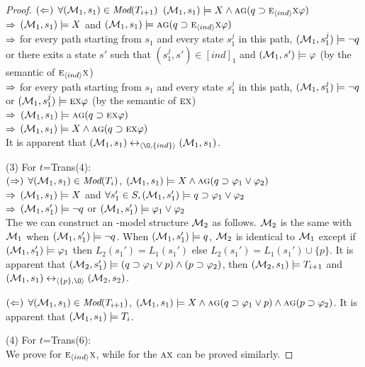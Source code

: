 \documentclass{article}
\begin{document}
\begin{proof}
$(\Leftarrow)$ $\forall ({\cal M}_1,s_1) \in \textit{Mod}(T_{i+1})$ \ie $({\cal M}_1,s_1) \models X \wedge \textsc{a} \textsc{g}(q \supset \textsc{e}_{{\langle{ind}\rangle}} \textsc{x} \varphi )$\\
$\Rightarrow$ $({\cal M}_1,s_1) \models X$ and $({\cal M}_1,s_1) \models \textsc{a} \textsc{g}(q \supset \textsc{e}_{{\langle{ind}\rangle}} \textsc{x} \varphi)$\\
$\Rightarrow$ for every path starting from $s_1$ and every state $s_1^j$ in this path, $({\cal M}_1, s_1^j) \models \neg q$ or there exits a state $s'$ such that $(s_1^j, s')\in [ind]_1$ and $({\cal M}_1, s') \models \varphi$ \hfill (by the semantic of $\textsc{e}_{{\langle{ind}\rangle}} \textsc{x}$)\\
$\Rightarrow$ for every path starting from $s_1$ and every state $s_1^j$ in this path, $({\cal M}_1, s_1^j) \models \neg q$ or $({\cal M}_1, s_1^j) \models \textsc{e} \textsc{x} \varphi$ \hfill (by the semantic of $\textsc{e} \textsc{x}$)\\
$\Rightarrow$ $({\cal M}_1,s_1) \models \textsc{a}\textsc{g}(q \supset \textsc{e} \textsc{x} \varphi)$\\
$\Rightarrow$ $({\cal M}_1, s_1) \models X \wedge \textsc{a}\textsc{g}(q \supset \textsc{e} \textsc{x} \varphi)$\\
It is apparent that $(\Hm_1, s_1) \lrto_{\tuple{{\O}, \{ind\}}} (\Hm_1, s_1)$.

(3) For $t$=Trans(4):\\
$(\Rightarrow)$ $\forall ({\cal M}_1,s_1) \in \textit{Mod}(T_i)$, \ie $({\cal M}_1,s_1) \models X \wedge \textsc{a}\textsc{g} (q \supset \varphi_1 \vee \varphi_2)$ \\
$\Rightarrow$ $({\cal M}_1,s_1) \models X$ and $\forall s_1'\in S, ({\cal M}_1,s_1') \models q \supset \varphi_1 \vee \varphi_2$\\
$\Rightarrow$ $({\cal M}_1,s_1') \models \neg q$ or $({\cal M}_1,s_1') \models \varphi_1 \vee \varphi_2$\\
The we can construct an \Ind-model structure ${\cal M}_2$ as follows. ${\cal M}_2$ is the same with ${\cal M}_1$ when $({\cal M}_1,s_1') \models \neg q$. When $({\cal M}_1,s_1') \models q$, ${\cal M}_2$ is identical to ${\cal M}_1$ except if $({\cal M}_1,s_1') \models \varphi_1$ then $L_2(s_1')= L_1(s_1')$ else $L_2(s_1') = L_1(s_1') \cup \{p\}$. It is apparent that $({\cal M}_2,s_1') \models (q\supset \varphi_1 \vee p) \wedge (p \supset \varphi_2)$, then $({\cal M}_2,s_1) \models T_{i+1}$ and $(\Hm_1, s_1) \lrto_{\tuple{\{p\}, {\O}}} (\Hm_2, s_2)$.

$(\Leftarrow)$ $\forall ({\cal M}_1, s_1) \in \textit{Mod}(T_{i+1})$, \ie $({\cal M}_1,s_1) \models X \wedge \textsc{a}\textsc{g} (q\supset \varphi_1 \vee p) \wedge \textsc{a}\textsc{g}(p \supset \varphi_2)$. It is apparent that $({\cal M}_1, s_1) \models T_i$.


(4) For $t$=Trans(6):\\
We prove for $\textsc{e}_{{\langle{ind}\rangle}} \textsc{x}$, while for the $\textsc{a} \textsc{x}$ can be proved similarly.


\end{proof}
\end{document}
